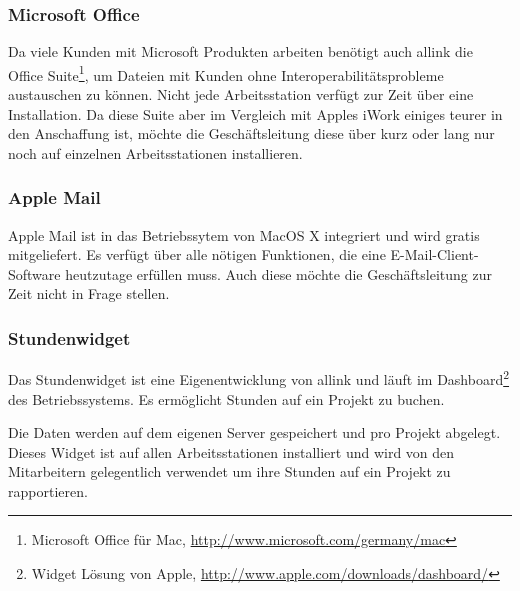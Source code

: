 \subsubsection{Microsoft Office}
Da viele Kunden mit Microsoft Produkten arbeiten benötigt auch allink die
Office Suite\footnote{Microsoft Office für Mac, \url{http://www.microsoft.com/germany/mac}}, 
um Dateien mit Kunden ohne Interoperabilitätsprobleme austauschen zu können. 
Nicht jede Arbeitsstation verfügt zur Zeit über eine Installation. Da diese
Suite aber im Vergleich mit Apples iWork einiges teurer in den Anschaffung ist,
möchte die Geschäftsleitung diese über kurz oder lang nur noch auf einzelnen
Arbeitsstationen installieren.

\subsubsection{Apple Mail}
Apple Mail ist in das Betriebssytem von MacOS X integriert und wird gratis
mitgeliefert. Es verfügt über alle nötigen Funktionen, die eine E-Mail-Client-Software
heutzutage erfüllen muss. Auch diese möchte die Geschäftsleitung zur Zeit nicht
in Frage stellen.

\subsubsection{Stundenwidget}
Das Stundenwidget ist eine Eigenentwicklung von allink und läuft
im Dashboard\footnote{Widget Lösung von Apple, \url{http://www.apple.com/downloads/dashboard/}}
des Betriebssystems. Es ermöglicht Stunden auf ein Projekt zu buchen.

Die Daten werden auf dem eigenen Server gespeichert und pro Projekt abgelegt. Dieses Widget ist auf allen
Arbeitsstationen installiert und wird von den Mitarbeitern gelegentlich verwendet
um ihre Stunden auf ein Projekt zu rapportieren.
